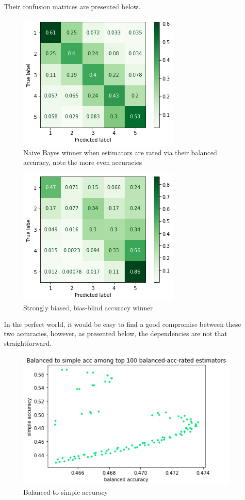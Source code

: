 \documentclass[letterpaper]{article}
\begin{document}
Their confusion matrices are presented below.

\begin{figure}[H]
    \centering
    \includegraphics[scale=0.65]{naive-bayes-best-balanced.png}
    \caption{Naive Bayes winner when estimators are rated via their balanced accuracy, note the more even accuracies}
\end{figure}

\begin{figure}[H]
    \centering
    \includegraphics[scale=0.65]{naive-bayes-best-real-world.png}
    \caption{Strongly biased, bias-blind accuracy winner}
\end{figure}

In the perfect world, it would be easy to find a good compromise between these two accuracies, however, as presented
below, the dependencies are not that straightforward.

\begin{figure}[h]
    \centering
    \includegraphics[scale=0.5]{naive-bayes-balanced-to-simple.png}
    \caption{Balanced to simple accuracy}
\end{figure}
\end{document}
